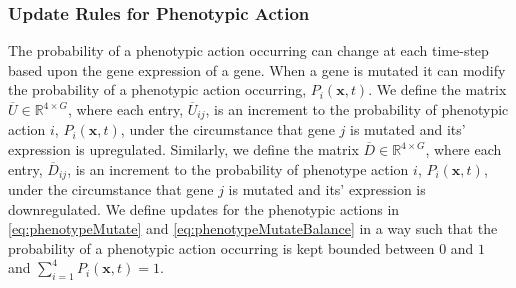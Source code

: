 \documentclass[\main/thesis.tex]{subfiles}
\begin{document}
\subsubsection{Update Rules for Phenotypic Action}
The probability of a phenotypic action occurring can change at each time-step based upon the gene expression of a gene. When a gene is mutated it can modify the probability of a phenotypic action occurring, $P_i(\boldsymbol{x}, t)$.
We define the matrix $\overline{U} {\in} \mathbb{R}^{4{\times}G}$, where each entry, 
$\overline{U}_{ij}$, is an increment to the probability of phenotypic action $i$,
$P_i(\boldsymbol{x}, t)$, under the circumstance that gene $j$ is mutated and its' 
expression is upregulated. Similarly, we define the matrix
$\overline{D} {\in} \mathbb{R}^{4{\times}G}$, where each entry, $\overline{D}_{ij}$, is 
an increment to the probability of phenotype action $i$, $P_i(\boldsymbol{x}, t)$, under the circumstance that gene $j$ is mutated and its' expression is downregulated. We define updates for the phenotypic actions in \eqref{eq:phenotypeMutate} and \eqref{eq:phenotypeMutateBalance} in a way such that  the probability of a phenotypic action occurring is kept bounded between $0$ and $1$ and
$\sum_{i{=}1}^{4} P_i(\boldsymbol{x}, t) {=} 1$. 
\end{document}
